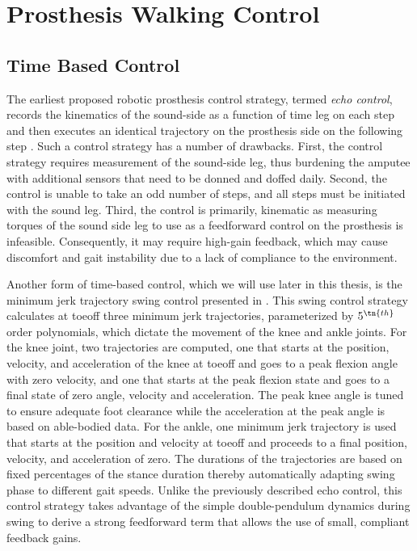 \section{Prosthesis Walking Control}\label{sec:back_walking_control}

\subsection{Time Based Control}
The earliest proposed robotic prosthesis control strategy, termed \emph{echo
control}, records the kinematics of the sound-side as a function of time leg on
each step and then executes an identical trajectory on the prosthesis side on
the following step \citep{grimes1977feasibility,grimes1979active}. Such a
control strategy has a number of drawbacks. First, the control strategy requires
measurement of the sound-side leg, thus burdening the amputee with additional
sensors that need to be donned and doffed daily. Second, the control is unable
to take an odd number of steps, and all steps must be initiated with the sound
leg. Third, the control is primarily, kinematic as measuring torques of the
sound side leg to use as a feedforward control on the prosthesis is infeasible.
Consequently, it may require high-gain feedback, which may cause discomfort and
gait instability due to a lack of compliance to the environment.  

Another form of time-based control, which we will use later in this thesis, is
the minimum jerk trajectory swing control presented in \citet{lenzi2014speed}.
This swing control strategy calculates at toeoff three minimum jerk
trajectories, parameterized by $5^\tn{th}$ order polynomials, which dictate the
movement of the knee and ankle joints. For the knee joint, two trajectories are
computed, one that starts at the position, velocity, and acceleration of the
knee at toeoff and goes to a peak flexion angle with zero velocity, and one that
starts at the peak flexion state and goes to a final state of zero angle,
velocity and acceleration. The peak knee angle is tuned to ensure adequate foot
clearance while the acceleration at the peak angle is based on able-bodied data.
For the ankle, one minimum jerk trajectory is used that starts at the position
and velocity at toeoff and proceeds to a final position, velocity, and
acceleration of zero. The durations of the trajectories are based on fixed
percentages of the stance duration thereby automatically adapting swing phase to
different gait speeds. Unlike the previously described echo control, this
control strategy takes advantage of the simple double-pendulum dynamics during
swing to derive a strong feedforward term that allows the use of small,
compliant feedback gains.


